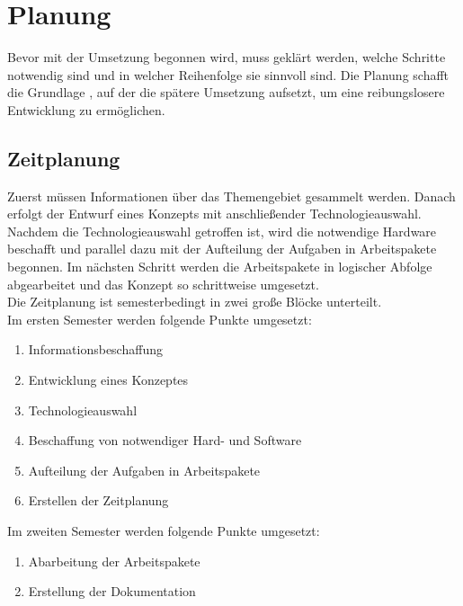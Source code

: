 \chapter{Planung}\label{Planung}
Bevor mit der Umsetzung begonnen wird, muss geklärt werden, welche Schritte notwendig sind und in welcher Reihenfolge sie sinnvoll sind. Die Planung schafft die Grundlage , auf der die spätere Umsetzung aufsetzt, um eine reibungslosere Entwicklung zu ermöglichen.

\section{Zeitplanung}\label{Zeitplanung}
Zuerst müssen Informationen über das Themengebiet gesammelt werden. Danach erfolgt der
Entwurf eines Konzepts mit anschließender Technologieauswahl. Nachdem die
Technologieauswahl getroffen ist, wird die notwendige Hardware beschafft und
parallel dazu mit der Aufteilung der Aufgaben in Arbeitspakete begonnen. Im
nächsten Schritt werden die Arbeitspakete in logischer Abfolge abgearbeitet und
das Konzept so schrittweise umgesetzt.\\
Die Zeitplanung ist semesterbedingt in zwei große Blöcke unterteilt.\\
Im ersten Semester werden folgende Punkte umgesetzt:

\begin{enumerate}
	\item Informationsbeschaffung
	\item Entwicklung eines Konzeptes
	\item Technologieauswahl
	\item Beschaffung von notwendiger Hard- und Software
	\item Aufteilung der Aufgaben in Arbeitspakete
	\item Erstellen der Zeitplanung
\end{enumerate}

Im zweiten Semester werden folgende Punkte umgesetzt:

\begin{enumerate}
	\item Abarbeitung der Arbeitspakete
	\item Erstellung der Dokumentation
\end{enumerate}
